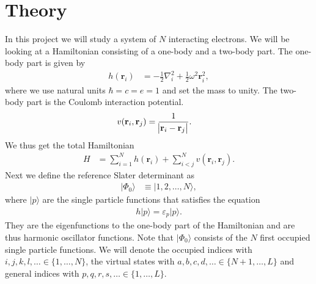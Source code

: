 \documentclass[
    a4paper, aps, twocolumn, floatfix, superscriptaddress,
    nofootinbib]{revtex4-1}
\newcommand{\vf}{\mathbf}
\newcommand{\1}{\mathds{1}}
\newcommand{\half}{\frac{1}{2}}
\newcommand{\ket}[1]{\rvert #1\rangle}
\begin{document}
\section{Theory}
    In this project we will study a system of $N$ interacting electrons. We will
    be looking at a Hamiltonian consisting of a one-body and a two-body part.
    The one-body part is given by
    \begin{align}
        h(\vf{r}_i)
        &= -\half\nabla_i^2 + \half\omega^2 \vf{r}_i^2,
    \end{align}
    where we use natural units $\hbar = c = e = 1$ and set the mass to unity.
    The two-body part is the Coulomb interaction potential.
    \begin{align}
        v(\vf{r}_i, \vf{r}_j)
        &= \frac{1}{\abs{\vf{r}_i - \vf{r}_j}}.
    \end{align}
    We thus get the total Hamiltonian
    \begin{align}
        H &= \sum_{i = 1}^N h(\vf{r}_i) + \sum_{i < j}^N v(\vf{r}_i, \vf{r}_j).
    \end{align}
    Next we define the reference Slater determinant as
    \begin{align}
        \ket{\Phi_0} &\equiv \ket{1, 2, \dots, N},
    \end{align}
    where $\ket{p}$ are the single particle functions that satisfies the
    equation
    \begin{align}
        h\ket{p} = \varepsilon_p\ket{p}.
    \end{align}
    They are the eigenfunctions to the one-body part of the Hamiltonian and are
    thus harmonic oscillator functions. Note that $\ket{\Phi_0}$ consists of the
    $N$ first occupied single particle functions. We will denote the occupied
    indices with $i, j, k, l, \dots \in \{1, \dots, N\}$, the virtual states
    with $a, b, c, d, \dots \in \{N + 1, \dots, L\}$ and general indices with
    $p, q, r, s, \dots \in \{1, \dots, L\}$.
\end{document}
